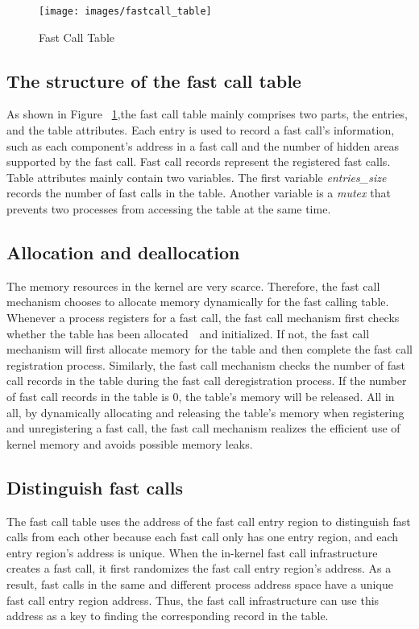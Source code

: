 \begin{figure}[tbp]
  \centering
  \texttt{[image: images/fastcall\_table]}
  \caption[Fast Call Table]{Fast Call Table}
  \label{fig:fastcall_table}
\end{figure}

\subsection{The structure of the fast call table}
As shown in Figure ~\ref{fig:fastcall_table},the fast call table mainly comprises two parts, 
the entries, and the table attributes. 
Each entry is used to record a fast call's information, 
such as each component's address in a fast call and the number of 
hidden areas supported by the fast call. Fast call records represent the registered fast calls. Table attributes mainly 
contain two variables. The first variable \emph{entries\_size} 
records the number of fast calls in the table. Another variable is a 
\emph{mutex} that prevents two processes from accessing the table at the same time.


\subsection{Allocation and deallocation}
The memory resources in the kernel are very scarce. 
Therefore, the fast call mechanism chooses to allocate memory dynamically for the fast calling table. 
Whenever a process registers for a fast call, the fast call mechanism 
first checks whether the table has been allocated　and initialized. If not, the fast call mechanism will 
first allocate memory for the table and then complete the fast call registration process.
Similarly, the fast call mechanism checks the number of fast call records in the table during the fast 
call deregistration process. If the number of fast call records in the table is 0, the table's memory will be released.
All in all, by dynamically allocating and releasing the table's memory when registering and unregistering a 
fast call, the fast call mechanism realizes the efficient use of kernel memory and avoids possible memory leaks. 

\subsection{Distinguish fast calls}
The fast call table uses the address of the fast call entry region to distinguish 
fast calls from each other because each fast call only has one entry region, and each 
entry region's address is unique.  When the in-kernel fast call infrastructure creates 
a fast call, it first randomizes the fast call entry region's address. As a result, 
fast calls in the same and different process address space have a unique fast call entry 
region address. Thus, the fast call infrastructure can use this address as a key to finding the corresponding record in the table.



